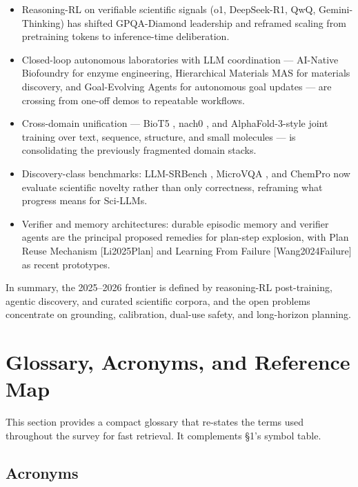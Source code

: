 \documentclass{article}
\begin{document}
\begin{itemize}

\item
  Reasoning-RL on verifiable scientific signals (o1, DeepSeek-R1, QwQ, Gemini-Thinking) has shifted GPQA-Diamond leadership and reframed scaling from pretraining tokens to inference-time deliberation.
\item
  Closed-loop autonomous laboratories with LLM coordination --- AI-Native Biofoundry \cite{zhang2026anainativebiofound} for enzyme engineering, Hierarchical Materials MAS \cite{rothfarb2025hierarchicalmultia} for materials discovery, and Goal-Evolving Agents \cite{du2025acceleratingscient} for autonomous goal updates --- are crossing from one-off demos to repeatable workflows.
\item
  Cross-domain unification --- BioT5 \cite{pei2023emnlp2023}, nach0 \cite{livne2024nach0multimodalnat}, and AlphaFold-3-style joint training over text, sequence, structure, and small molecules --- is consolidating the previously fragmented domain stacks.
\item
  Discovery-class benchmarks: LLM-SRBench \cite{shojaee2025llmsrbenchanewbenc}, MicroVQA \cite{burgess2023microvqaamultimoda}, and ChemPro \cite{baranwal2026arxiv2602031082026} now evaluate scientific novelty rather than only correctness, reframing what progress means for Sci-LLMs.
\item
  Verifier and memory architectures: durable episodic memory and verifier agents are the principal proposed remedies for plan-step explosion, with Plan Reuse Mechanism {[}Li2025Plan{]} and Learning From Failure {[}Wang2024Failure{]} as recent prototypes.
\end{itemize}

In summary, the 2025--2026 frontier is defined by reasoning-RL post-training, agentic discovery, and curated scientific corpora, and the open problems concentrate on grounding, calibration, dual-use safety, and long-horizon planning.

\section{Glossary, Acronyms, and Reference Map}\label{glossary-acronyms-and-reference-map}

This section provides a compact glossary that re-states the terms used throughout the survey for fast retrieval. It complements §1's symbol table.

\subsection{Acronyms}\label{acronyms}
\end{document}
